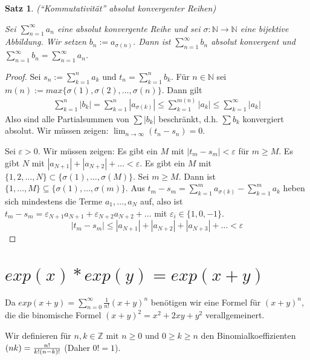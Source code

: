 \documentclass[a4paper,10pt]{article}
\newtheorem{satz}{Satz}
\begin{document}
\begin{satz}
 (``Kommutativität'' absolut konvergenter Reihen)

 Sei $\sum_{n = 1}^\infty a_n$ eine absolut konvergente Reihe und sei $\sigma: \mathbb{N} \rightarrow \mathbb{N}$ eine bijektive Abbildung.
 Wir setzen $b_n := a_{\sigma(n)}$.
 Dann ist $\sum_{n = 1}^\infty b_n$ absolut konvergent und $\sum_{n = 1}^\infty b_n = \sum_{n = 1}^\infty a_n$.
\end{satz}

\begin{proof}
 Sei $s_n := \sum_{k = 1}^n a_k$ und $t_n = \sum_{k = 1}^n b_k$.
 Für $n \in \mathbb{N}$ sei $m(n) := max \{\sigma(1), \sigma(2), \dots, \sigma(n)\}$.
 Dann gilt
 \begin{align*}
  \sum_{k = 1}^n |b_k| = \sum_{k = 1}^n |a_{\sigma(k)}| \le \sum_{k = 1}^{m(n)} |a_k| \le \sum_{k = 1}^\infty |a_k|
 \end{align*}
 Also sind alle Partialsummen von $\sum |b_k|$ beschränkt, d.h. $\sum b_k$ konvergiert absolut.
 Wir müssen zeigen: $\lim_{n \rightarrow \infty} (t_n - s_n) = 0$.
 
 Sei $\varepsilon > 0$.
 Wir müssen zeigen: Es gibt ein $M$ mit $|t_m - s_m| < \varepsilon$ für $m \ge M$.
 Es gibt $N$ mit $|a_{N + 1}| + |a_{N + 2}| + \dots < \varepsilon$.
 Es gibt ein $M$ mit $\{1, 2, \dots, N\} \subset \{\sigma(1), \dots, \sigma(M)\}$.
 Sei $m \ge M$.
 Dann ist $\{1, \dots, M\} \subseteq \{\sigma(1), \dots, \sigma(m)\}$.
 Aus $t_m - s_m = \sum_{k = 1}^m a_{\sigma(k)} - \sum_{k = 1}^m a_k$ heben sich mindestens die Terme $a_1, \dots, a_N$ auf, also ist $t_m - s_m = \varepsilon_{N + 1}a_{N + 1} + \varepsilon_{N + 2}a_{N + 2} + \dots$ mit $\varepsilon_i \in \{1, 0, -1\}$.
 \begin{equation*}
  |t_m - s_m| \le |a_{N + 1}| + |a_{N + 2}| + |a_{N + 3}| + \dots < \varepsilon
 \end{equation*}
\end{proof}

\section*{$exp(x) * exp(y) = exp(x + y)$}

Da $exp(x + y) = \sum_{n = 0}^\infty \frac{1}{n!} (x + y)^n$ benötigen wir eine Formel für $(x + y)^n$, die die binomische Formel $(x + y)^2 = x^2 + 2xy + y^2$ verallgemeinert.

Wir definieren für $n, k \in \mathbb{Z}$ mit $n \ge 0$ und $0 \ge k \ge n$ den Binomialkoeffizienten $(n\\k) = \frac{n!}{k!(n - k)!}$ (Daher $0! = 1$).
\end{document}
